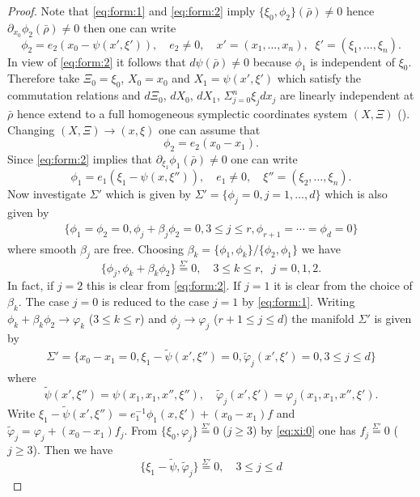 \documentclass[12pt,leqno]{article} %
\def\dif{\partial}
\def\be{\beta}
\def\sieq{\overset{\Sigma'}{=}}
\def\bro{\bar\rho}
\def\bro{\bar\rho}
\numberwithin{equation}{section}
\begin{document}
\begin{proof} 
Note that \eqref{eq:form:1} and \eqref{eq:form:2} imply $
\{\xi_0,\phi_2\}(\bro)\neq 0$ hence $\dif_{x_0}\phi_2(\bro)\neq 0$ then one can write
%
\[
\phi_2=e_2(x_0-\psi(x',\xi')),\quad e_2\neq 0,\quad x'=(x_1,\ldots,x_n),\;\;\xi'=(\xi_1,\ldots,\xi_n).
\]
%
In view of \eqref{eq:form:2} it follows that $d\psi(\bro)\neq 0$ because $\phi_1$ is independent of $\xi_0$. Therefore take $\Xi_0=\xi_0$, $X_0=x_0$ and $X_1=\psi(x',\xi')$ which satisfy the commutation relations and $d\Xi_0$, $dX_0$, $dX_1$, $\Sigma_{j=0}^n\xi_jdx_j$ are linearly independent at
$\bro$ hence extend to a full homogeneous symplectic coordinates system $(X,\Xi)$ (\cite[Theorem 21.1.9]{MR781536}). Changing $(X,\Xi)\to (x,\xi)$ one can assume that
%
\[
\phi_2=e_2(x_0-x_1).
\]
%
Since \eqref{eq:form:2} implies that $\dif_{\xi_1}\phi_1(\bro)\neq 0$ one can write
%
\[
\phi_1=e_1(\xi_1-\psi(x,\xi'')),\quad e_1\neq0,\quad \xi''=(\xi_2,\ldots,\xi_n).
\]
%
Now investigate $\Sigma'$ which is given by $\Sigma'=\{\phi_j=0,j=1,\ldots, d\}$ which is also given by
%
\begin{gather*}
\{\phi_1=\phi_2=0, \phi_j+\be_j\phi_2=0, 3\leq j\leq r, \phi_{r+1}=\cdots=\phi_d=0\}
\end{gather*}
%
where smooth $\be_j$ are free. Choosing $\be_k=\{\phi_1,\phi_k\}/\{\phi_2,\phi_1\}$ we have
%
\begin{equation}
\label{eq:xi:0}
\{\phi_j, \phi_k+\be_k\phi_2\}\sieq 0,\quad 3\leq k\leq r,\;\;j=0,1,2.
\end{equation}
%
In fact, if $j=2$ this is clear from \eqref{eq:form:2}. If $j=1$ it is clear from the choice of $\be_k$. The case $j=0$ is reduced to the case $j=1$ by \eqref{eq:form:1}. Writing $\phi_k+\be_k\phi_2\to\varphi_k$ ($3\leq k\leq r$) and  $\phi_j\to \varphi_j$ ($r+1\leq j\leq d$) the manifold $\Sigma'$ is given by
%
\begin{gather*}
\Sigma'=\{x_0-x_1=0, \xi_1-\tilde\psi(x',\xi'')=0, \tilde\varphi_j(x',\xi')=0, 3\leq j\leq d\}
\end{gather*}
%
where
%
\[
\tilde\psi(x',\xi'')=\psi(x_1,x_1,x'', \xi''),\quad \tilde\varphi_j(x',\xi')=\varphi_j(x_1,x_1,x'',\xi').
\]
%
Write  $\xi_1-\tilde\psi(x',\xi'')=e_1^{-1}\phi_1(x,\xi')+(x_0-x_1)f$ and $\tilde\varphi_j=\varphi_j+(x_0-x_1)f_j$. From $\{\xi_0,\varphi_j\}\sieq 0$ ($j\geq 3$) by \eqref{eq:xi:0} one has  $f_j\sieq 0$ ($j\geq 3$). Then we have
%
\begin{equation}
\label{eq:kankei:2-1}
\{\xi_1-\tilde\psi,\tilde\varphi_j\}\sieq 0,\quad 3\leq j\leq d
\end{equation}

\end{proof}
\end{document}
